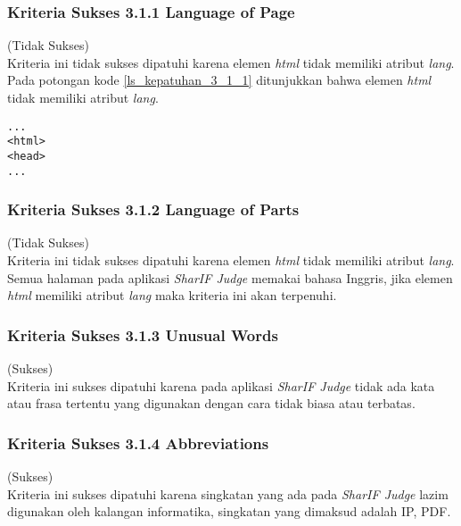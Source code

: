 \subsubsection{Kriteria Sukses 3.1.1 Language of Page}
\label{subsubsec:kepatuhan_kriteria_3.1.1}
(Tidak Sukses) \\

Kriteria ini tidak sukses dipatuhi karena elemen \textit{html} tidak memiliki atribut \textit{lang}. Pada potongan kode \ref{ls_kepatuhan_3_1_1} ditunjukkan bahwa elemen \textit{html} tidak memiliki atribut \textit{lang}.
\begin{lstlisting}[basicstyle=\ttfamily, frame=single,
columns=fullflexible, keepspaces=true, breaklines=true, label=ls_kepatuhan_3_1_1, caption=Kriteria Sukses 3.1.1 - Elemen \textit{HTML}]
...
<html>
<head>
...
\end{lstlisting}

\subsubsection{Kriteria Sukses 3.1.2 Language of Parts}
\label{subsubsec:kepatuhan_kriteria_3.1.2}
(Tidak Sukses) \\

Kriteria ini tidak sukses dipatuhi karena elemen \textit{html} tidak memiliki atribut \textit{lang}. Semua halaman pada aplikasi \textit{SharIF Judge} memakai bahasa Inggris, jika elemen \textit{html} memiliki atribut \textit{lang} maka kriteria ini akan terpenuhi.

\subsubsection{Kriteria Sukses 3.1.3 Unusual Words}
\label{subsubsec:kepatuhan_kriteria_3.1.3}
(Sukses) \\

Kriteria ini sukses dipatuhi karena pada aplikasi \textit{SharIF Judge} tidak ada kata atau frasa tertentu yang digunakan dengan cara tidak biasa atau terbatas. 

\subsubsection{Kriteria Sukses 3.1.4 Abbreviations}
\label{subsubsec:kepatuhan_kriteria_3.1.4}
(Sukses) \\

Kriteria ini sukses dipatuhi karena singkatan yang ada pada \textit{SharIF Judge} lazim digunakan oleh kalangan informatika, singkatan yang dimaksud adalah IP, PDF.

